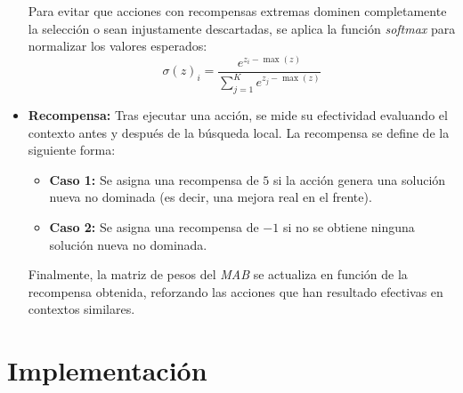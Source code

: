 \documentclass[12pt,a4paper]{book}
\begin{document}
\begin{itemize}
    Para evitar que acciones con recompensas extremas dominen completamente la selección o sean injustamente descartadas, se aplica la función \textit{softmax} para normalizar los valores esperados:
    \begin{equation}
        \sigma(z)_i = \frac{e^{z_i - \max(z)}}{\sum_{j=1}^{K} e^{z_j - \max(z)}}
    \end{equation}

    \item \textbf{Recompensa:} Tras ejecutar una acción, se mide su efectividad evaluando el contexto antes y después de la búsqueda local. La recompensa se define de la siguiente forma:
    \begin{itemize}
        \item \textbf{Caso 1:} Se asigna una recompensa de $5$ si la acción genera una solución nueva no dominada (es decir, una mejora real en el frente).
        \item \textbf{Caso 2:} Se asigna una recompensa de $-1$ si no se obtiene ninguna solución nueva no dominada.
    \end{itemize}

    Finalmente, la matriz de pesos del \textit{MAB} se actualiza en función de la recompensa obtenida, reforzando las acciones que han resultado efectivas en contextos similares.
\end{itemize}

\newpage

\section{Implementación}
\end{document}
